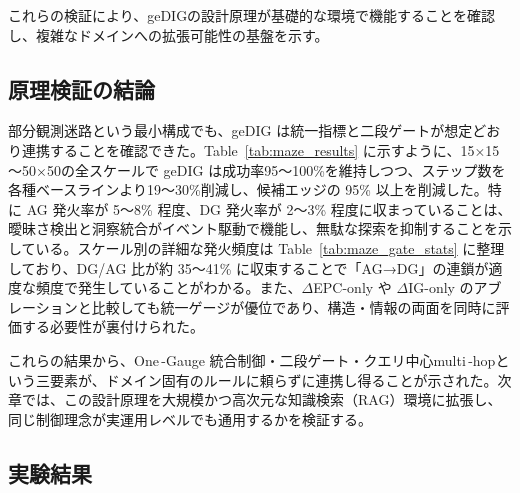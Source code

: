\documentclass[ja=standard,xelatex]{bxjsarticle}
\begin{document}
これらの検証により、geDIGの設計原理が基礎的な環境で機能することを確認し、複雑なドメインへの拡張可能性の基盤を示す。

\subsection{原理検証の結論}

部分観測迷路という最小構成でも、geDIG は統一指標と二段ゲートが想定どおり連携することを確認できた。Table~\ref{tab:maze_results} に示すように、15×15～50×50の全スケールで geDIG は成功率95～100\%を維持しつつ、ステップ数を各種ベースラインより19～30\%削減し、候補エッジの 95\% 以上を削減した。特に AG 発火率が 5～8\% 程度、DG 発火率が 2～3\% 程度に収まっていることは、曖昧さ検出と洞察統合がイベント駆動で機能し、無駄な探索を抑制することを示している。スケール別の詳細な発火頻度は Table~\ref{tab:maze_gate_stats} に整理しており、DG/AG 比が約 35〜41\% に収束することで「AG→DG」の連鎖が適度な頻度で発生していることがわかる。また、$\Delta$EPC-only や $\Delta$IG-only のアブレーションと比較しても統一ゲージが優位であり、構造・情報の両面を同時に評価する必要性が裏付けられた。

これらの結果から、One\,\mbox{-}Gauge 統合制御・二段ゲート・クエリ中心multi\,\mbox{-}hopという三要素が、ドメイン固有のルールに頼らずに連携し得ることが示された。次章では、この設計原理を大規模かつ高次元な知識検索（RAG）環境に拡張し、同じ制御理念が実運用レベルでも通用するかを検証する。

\subsection{実験結果}
\end{document}
